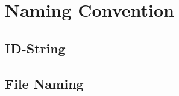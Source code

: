 \section{Naming Convention}
\label{sec:NamingConvention}
\subsection{ID-String}
\label{sec:IDString}
\subsection{File Naming}
\label{sec:FileNaming}
